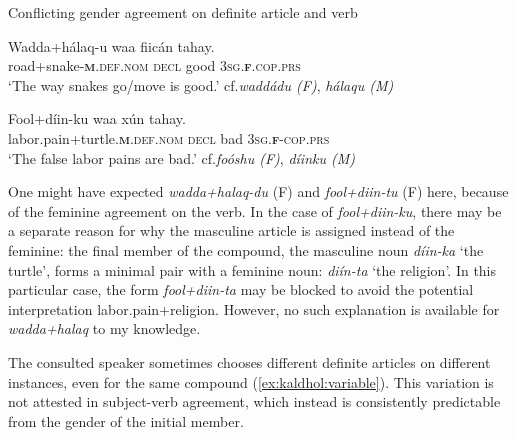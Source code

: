 \documentclass[output=paper]{langscibook}
\begin{document}
\ea\label{ex:kaldhol:conflict}
	Conflicting gender agreement on definite article and verb
	\begin{xlist}
			\ex
				\gll Wadda+hálaq-u waa fiicán tahay.\\
				road+snake-\textsc{\textbf{m}.def.nom} \textsc{decl} good \textsc{3sg.\textbf{f}.cop.prs}\\
				\glt `The way snakes go/move is good.' \hfill cf.\@ \textit{waddádu (F)}, \textit{hálaqu (M)}
				
			\ex\label{ex:kaldhol:fooldiin}
				\gll Fool+díin-ku waa xún tahay.\\
				labor.pain+turtle.\textsc{\textbf{m}.def.nom} \textsc{decl} bad \textsc{3sg.\textbf{f}}-\textsc{cop.prs}\\
				\glt `The false labor pains are bad.'	\hfill cf.\@ \textit{foóshu (F)}, \textit{díinku (M)}
	\end{xlist}
\z
One might have expected \textit{wadda+halaq-du} (F) and \textit{fool+diin-tu} (F) here, because of the feminine agreement on the verb. In the case of \textit{fool+diin-ku}, there may be a separate reason for why the masculine article is assigned instead of the feminine: the final member of the compound, the masculine noun \textit{díin-ka} `the turtle', forms a minimal pair with a feminine noun: \textit{diín-ta} `the religion'. In this particular case, the form \textit{fool+diin-ta} may be blocked to avoid the potential interpretation labor.pain+religion. However, no such explanation is available for \textit{wadda+halaq} to my knowledge. 

The consulted speaker sometimes chooses different definite articles on different instances, even for the same compound (\ref{ex:kaldhol:variable}). This variation is not attested in subject-verb agreement, which instead is consistently predictable from the gender of the initial member.
\end{document}
